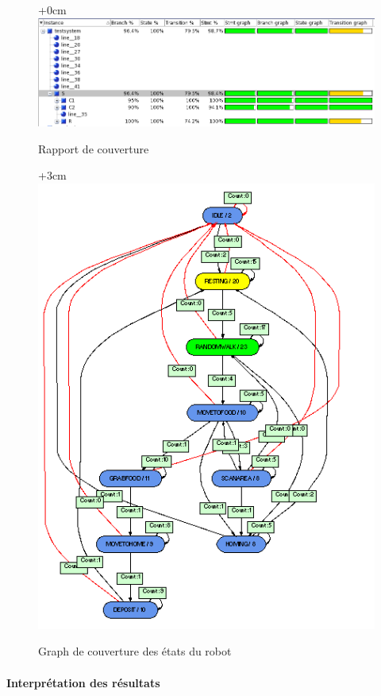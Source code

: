 \documentclass{article}
\begin{document}
\begin{figure}[!h]
\advance\leftskip+0cm
\includegraphics[scale=0.7]{PremiereCorrection/ResAfterVHD.PNG}
\caption{Rapport de couverture}

\end{figure}

\begin{figure}[!h]
\advance\leftskip+3cm
\includegraphics[scale=0.7]{PremiereCorrection/GRAPH.PNG}
\caption{Graph de couverture des états du robot}

\end{figure}


\paragraph{Interprétation des résultats}
\end{document}
